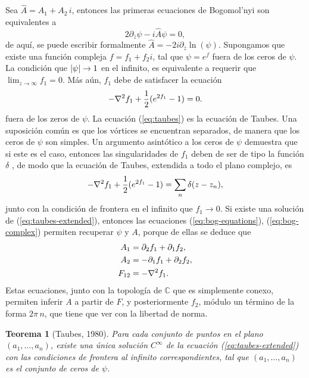 \documentclass[spanish]{amsart}
\newtheorem{theorem}{Teorema}
\newcommand*{\C}{\mathbb{C}}
\newcommand*{\del}{\partial}
\newcommand*{\delzbar}{\del_{\bar{z}}}
\newcommand*{\bog}{Bogomol'nyi{ }}
\begin{document}
Sea \(\hat{A} = A_1 + A_2\,i \), entonces las primeras ecuaciones de
\bog son equivalentes a
\begin{equation}
\label{eq:bog-complex}
2\delzbar \psi - i\hat{A}\psi = 0,
\end{equation}
de aquí, se puede escribir formalmente \(\hat{A} =
-2i\delzbar\ln(\psi) \). Supongamos que existe una función compleja
\(f = f_1 + f_2i \), tal que \(\psi = e^f \) fuera de los ceros de
\(\psi \). La condición que \(\abs{\psi} \to 1 \) en el infinito, es
equivalente a requerir que \(\lim_{z\to\infty}f_1 = 0 \).  Más aún, \(f_1 \) debe de
satisfacer la ecuación
\begin{equation}
\label{eq:taubes}
-\laplacian f_1 + \frac{1}{2} (e^{2f_1} - 1) = 0.
\end{equation}
fuera de los zeros de \(\psi \). La ecuación (\ref{eq:taubes}) es la
ecuación de Taubes. Una suposición común es que los vórtices se
encuentran separados, de manera que los ceros de \(\psi \) son
simples. Un argumento asintótico a los ceros de \(\psi \) demuestra
que si este es el caso, entonces las singularidades de \(f_1 \) deben
de ser de tipo la función \(\delta \) \cite{taubes1980}, de modo que
la ecuación de Taubes, extendida a todo el plano complejo, es
\begin{equation}
  \label{eq:taubes-extended}
-\laplacian f_1 + \frac{1}{2} (e^{2f_1} - 1) = \sum_n\delta(z - z_n),
\end{equation}
junto con la condición de frontera en el infinito que \(f_1 \to 0
\). Si existe una solución de (\ref{eq:taubes-extended}), entonces las
ecuaciones (\ref{eq:bog-equations}), (\ref{eq:bog-complex}) permiten
recuperar  \(\psi \) y \(A \), porque de ellas se deduce que 
\begin{align}
  A_1 &= \del_2f_1 + \del_1f_2,\\
  A_2 &= -\del_1f_1 + \del_2f_2,\\
  F_{12} &= - \laplacian f_1.
\end{align}
Estas ecuaciones, junto con la topología de \(\C \) que es simplemente
conexo, permiten inferir \(A \) a partir de \(F \), y posteriormente
\(f_2 \), módulo un término de la forma \(2\pi\,n \), que tiene que
ver con la libertad de norma. 

\begin{theorem}
  [Taubes, 1980]
  Para cada conjunto de puntos en el plano \((a_1,\ldots, a_n) \),
  existe una única solución \(C^{\infty} \) de la ecuación
  (\ref{eq:taubes-extended}) con las condiciones de frontera al
  infinito correspondientes, tal que \((a_1,\ldots, a_n) \) es el
  conjunto de ceros de \(\psi \).
\end{theorem}
\end{document}
